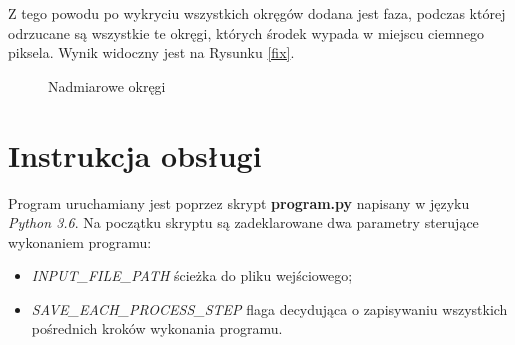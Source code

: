 \documentclass[12pt]{article}
\begin{document}
Z tego powodu po wykryciu wszystkich okręgów dodana jest faza, podczas której odrzucane są wszystkie te okręgi, których środek wypada w miejscu ciemnego piksela. Wynik widoczny jest na Rysunku \ref{fix}.

\begin{figure}[H]%
\centering
{}%
\qquad
{}%
\caption{Nadmiarowe okręgi}
\end{figure}

\section{Instrukcja obsługi}

Program uruchamiany jest poprzez skrypt \textbf{program.py} napisany w języku \textit{Python 3.6}. Na początku skryptu są zadeklarowane dwa parametry sterujące wykonaniem programu:
\begin{itemize}
\item \textit{INPUT\_FILE\_PATH} ścieżka do pliku wejściowego;
\item \textit{SAVE\_EACH\_PROCESS\_STEP} flaga decydująca o zapisywaniu wszystkich pośrednich kroków wykonania programu.
\end{itemize}
\end{document}

